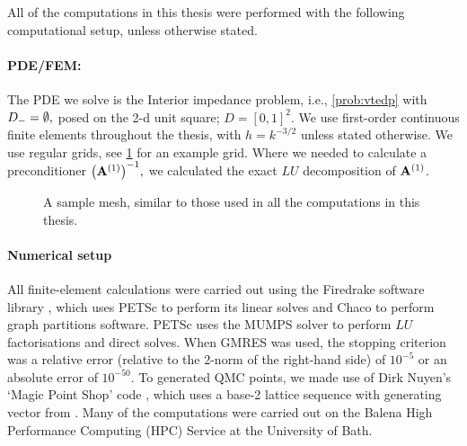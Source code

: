All of the computations in this thesis were performed with the following computational setup, unless otherwise stated.

\paragraph{PDE/FEM:}
The PDE we solve is the Interior impedance problem, i.e., \cref{prob:vtedp} with $D_{-} = \emptyset,$ posed on the 2-d unit square; $D = [0,1]^2.$ We use first-order continuous finite elements throughout the thesis, with $h = k^{-3/2}$ unless stated otherwise. We use regular grids, see \cref{fig:grid} for an example grid. Where we needed to calculate a preconditioner $\AmatoI,$ we calculated the exact $LU$ decomposition of $\mathbf{A}^{(1)}$.

\begin{figure}[h]
  \centering
  
  \caption{A sample mesh, similar to those used in all the computations in this thesis.\label{fig:grid}}
  \end{figure}

\paragraph{Numerical setup}
All finite-element calculations were carried out using the Firedrake software library \cite{RaHaMiLaLuMcBeMaKe:16,LuVaRaBeRaHaKe:15}, which uses PETSc to perform its linear solves \cite{BaAbAsBrBrBuDaEiGrKaKnMaMcMiMuRuSaSmZaZhZh:18,BaGrMcSm:97,DaPaKlCo:11,BaAbAdBrBrBuDaDeEiGrKaKaKnMaMcMiMuRuSaSmZaZh:19} and Chaco \cite{HeLe:95} to perform graph partitions software. PETSc uses the MUMPS \cite{AmDuLEKo:01,AmGuLEPr:06} solver to perform $LU$ factorisations and direct solves. When GMRES was used, the stopping criterion was a relative error (relative to the 2-norm of the right-hand side) of $10^{-5}$ or an absolute error of $10^{-50}.$ To generated QMC points, we made use of Dirk Nuyen's `Magic Point Shop' code \cite{Nu,KuNu:16}, which uses a base-2 lattice sequence with generating vector from \cite{CoKuNu:06}. Many of the computations were carried out on the Balena High Performance Computing (HPC) Service at the University of Bath.
